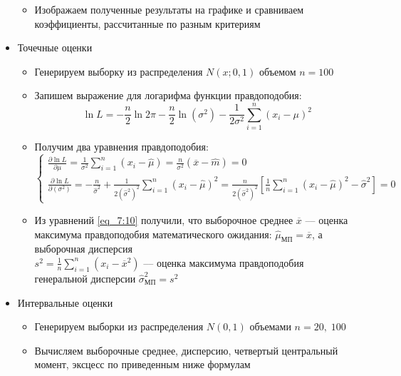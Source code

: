 \documentclass[12pt]{article}
\begin{document}
\begin{itemize}
\begin{itemize}
        \item Изображаем полученные результаты на графике и сравниваем коэффициенты, рассчитанные по разным критериям 
    \end{itemize}
    \item Точечные оценки
    \begin{itemize}
        \item Генерируем выборку из распределения $N(x; 0, 1)$ объемом $n = 100$ 
        \item Запишем выражение для логарифма функции правдоподобия:
        \begin{equation}
            \ln L = -\frac{n}{2} \ln 2\pi - \frac{n}{2} \ln(\sigma^2) - \frac{1}{2\sigma^2}\sum_{i=1}^{n}(x_i - \mu)^2
            \label{eq_7:9}
        \end{equation}
        \item Получим два уравнения правдоподобия:
        \begin{equation}
            \begin{cases}
                \displaystyle \frac{\partial \ln L}{\partial \mu} = \frac{1}{\sigma^2}\sum_{i=1}^{n}(x_i - \hat \mu) = \frac{n}{\sigma^2}(\overline x - \hat m) = 0 \\
                \displaystyle \frac{\partial \ln L}{\partial(\sigma^2)} = -\frac{n}{\hat \sigma^2} + \frac{1}{2(\hat \sigma^2)^2} \sum_{i=1}^{n}(x_i - \hat \mu)^2 = \frac{n}{2(\hat \sigma^2)^2} \left[\frac{1}{n} \sum_{i=1}^{n}(x_i - \hat \mu)^2 - \hat \sigma^2 \right] = 0
            \end{cases}
            \label{eq_7:10}
        \end{equation}
        \item Из уравнений \eqref{eq_7:10} получили, что выборочное среднее $\overline x$ –– оценка максимума правдоподобия математического ожидания: $\hat \mu_{\text{МП}} = \overline x$, а выборочная дисперсия \\ $s^2 = \frac{1}{n}\sum_{i=1}^{n}(x_i - \overline x^2)$ –– оценка максимума правдоподобия генеральной дисперсии $\hat \sigma^2_{\text{МП}} = s^2$
    \end{itemize}
    \item Интервальные оценки
    \begin{itemize}
        \item Генерируем выборки из распределения $N(0, 1)$ объемами $n = 20, \; 100$
        \item Вычисляем выборочные среднее, дисперсию, четвертый центральный момент, эксцесс по приведенным ниже формулам

\end{itemize}
\end{itemize}
\end{document}
